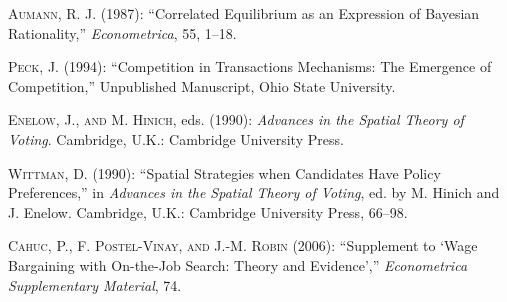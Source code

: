 \documentclass[ecta,nameyear,draft]{econsocart}
\theoremstyle{plain}
\theoremstyle{remark}
\begin{document}
\begin{thebibliography}{}
\textsc{Aumann, R. J.} (1987):
``Correlated Equilibrium as an Expression of Bayesian Rationality,''
\textit{Econometrica}, 55, 1--18.
\endbibitem

\textsc{Peck, J.} (1994):
``Competition in Transactions Mechanisms: The Emergence of Competition,''
Unpublished Manuscript, Ohio State University.
\endbibitem

\textsc{Enelow, J., and M. Hinich}, eds. (1990):
\textit{Advances in the Spatial Theory of Voting}.
Cambridge, U.K.: Cambridge University Press.
\endbibitem

\textsc{Wittman, D.} (1990):
``Spatial Strategies when Candidates Have Policy Preferences,''
in \textit{Advances in the Spatial Theory of Voting},
ed. by M. Hinich and J. Enelow.
Cambridge, U.K.: Cambridge University Press, 66--98.
\endbibitem

\textsc{Cahuc, P., F. Postel-Vinay, and J.-M. Robin} (2006): 
``Supplement to `Wage Bargaining with On-the-Job Search: Theory and Evidence',''
\textit{Econometrica Supplementary Material}, 74.
\endbibitem
\end{thebibliography}
\end{document}
